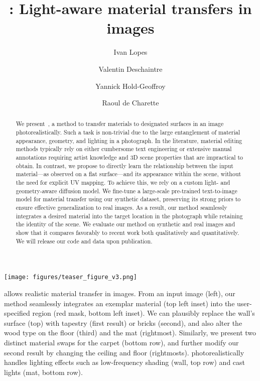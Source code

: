 \documentclass[acmtog,nonacm]{acmart}
\begin{document}
\author{Ivan Lopes}

\author{Valentin Deschaintre}

\author{Yannick Hold-Geoffroy}

\author{Raoul de Charette}

\title{\method{}: Light-aware material transfers in images}


\begin{abstract}
We present~\method{}, a method to transfer materials to designated surfaces in an image photorealistically.
Such a task is non-trivial due to the large entanglement of material appearance, geometry, and lighting in a photograph. In the literature, material editing methods typically rely on either cumbersome text engineering or extensive manual annotations requiring artist knowledge and 3D scene properties that are impractical to obtain. 
In contrast, we propose to directly learn the relationship between the input material---as observed on a flat surface---and its appearance within the scene, without the need for explicit UV mapping. To achieve this, we rely on a custom light- and geometry-aware diffusion model. We fine-tune a large-scale pre-trained text-to-image model for material transfer using our synthetic dataset, preserving its strong priors to ensure effective generalization to real images. As a result, our method seamlessly integrates a desired material into the target location in the photograph while retaining the identity of the scene. We evaluate our method on synthetic and real images and show that it compares favorably to recent work both qualitatively and quantitatively. We will release our code and data upon publication. 
\end{abstract}




\begin{teaserfigure}
  \texttt{[image: figures/teaser\_figure\_v3.png]}
  \vspace{-1.5em}
  \caption{\method{} allows realistic material transfer in images. From an input image (left), our method seamlessly integrates an exemplar material (top left inset) into the user-specified region (red mask, bottom left inset). We can plausibly replace the wall's surface (top) with tapestry (first result) or bricks (second), and also alter the wood type on the floor (third) and the mat (rightmost). Similarly, we present two distinct material swaps for the carpet (bottom row), and further modify our second result by changing the ceiling and floor (rightmosts). \method{} photorealistically handles lighting effects such as low-frequency shading (wall, top row) and cast lights (mat, bottom row). }
  \label{fig:teaser}
\end{teaserfigure}


\maketitle









\clearpage
\newpage


\end{document}
